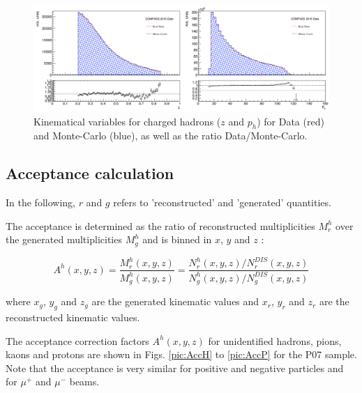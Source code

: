\begin{figure}[!h]
	\includegraphics[scale=0.45]{./gfx/SIDIS_kin.png}
	\caption{Kinematical variables for charged hadrons ($z$ and $p_h$) for Data (red) and Monte-Carlo (blue), as well as the ratio Data/Monte-Carlo.}
	\label{pic:MCSIDISkin}
\end{figure}

\subsection{Acceptance calculation}

In the following, $r$ and $g$ refers to 'reconstructed' and 'generated' quantities.

The acceptance is determined as the ratio of reconstructed multiplicities $M^h_r$ over the generated multiplicities $M^h_g$ and is binned in $x$, $y$ and $z$ :

\begin{equation}
  A^h(x,y,z) = \frac{M^h_r(x,y,z)}{M^h_g(x,y,z)}=\frac{N^h_r(x,y,z)/N^{DIS}_r(x,y,z)}{N^h_g(x,y,z)/N^{DIS}_g(x,y,z)}
\end{equation}

where $x_g$, $y_g$ and $z_g$ are the generated kinematic values and $x_r$, $y_r$ and $z_r$ are the reconstructed kinematic values.

The acceptance correction factors $A^h(x,y,z)$ for unidentified hadrons, pions, kaons and protons are shown in Figs. \ref{pic:AccH} to \ref{pic:AccP} for the P07 sample. Note that the acceptance is very similar for positive and negative particles and for $\mu^+$ and $\mu^-$ beams.

